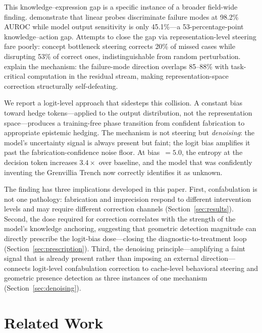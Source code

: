 \documentclass[11pt,a4paper]{article}
\begin{document}
This knowledge--expression gap is a specific instance of a broader field-wide
finding. \citet{basu2026interpretability} demonstrate that linear probes
discriminate failure modes at 98.2\% AUROC while model output sensitivity is
only 45.1\%---a 53-percentage-point knowledge--action gap. Attempts to close
the gap via representation-level steering fare poorly: concept bottleneck
steering corrects 20\% of missed cases while disrupting 53\% of correct ones,
indistinguishable from random perturbation. \citet{liu2026decodable} explain
the mechanism: the failure-mode direction overlaps 85--88\% with task-critical
computation in the residual stream, making representation-space correction
structurally self-defeating.

We report a logit-level approach that sidesteps this collision. A constant
bias toward hedge tokens---applied to the output distribution, not the
representation space---produces a training-free phase transition from confident
fabrication to appropriate epistemic hedging. The mechanism is not steering but
\emph{denoising}: the model's uncertainty signal is always present but faint;
the logit bias amplifies it past the fabrication-confidence noise floor. At
bias~$= 5.0$, the entropy at the decision token increases $3.4\times$ over
baseline, and the model that was confidently inventing the Grenvillia Trench
now correctly identifies it as unknown.

The finding has three implications developed in this paper. First,
confabulation is not one pathology: fabrication and imprecision respond to
different intervention levels and may require different correction channels
(Section~\ref{sec:results}). Second, the dose required for correction
correlates with the strength of the model's knowledge anchoring, suggesting
that geometric detection magnitude can directly prescribe the logit-bias
dose---closing the diagnostic-to-treatment loop
(Section~\ref{sec:prescription}). Third, the denoising principle---amplifying
a faint signal that is already present rather than imposing an external
direction---connects logit-level confabulation correction to cache-level
behavioral steering and geometric presence detection as three instances of one
mechanism (Section~\ref{sec:denoising}).

\section{Related Work}
\label{sec:related}
\end{document}

